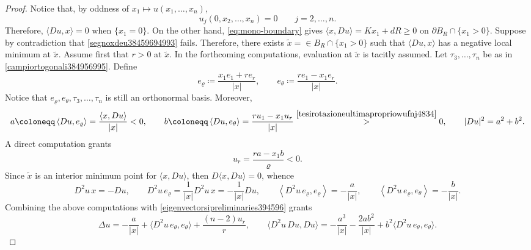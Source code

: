 \documentclass[11pt]{amsart}
\renewcommand{\geq}{\geqslant}
\renewcommand{\ge}{>}
\theoremstyle{definition}
\theoremstyle{remark}
\numberwithin{equation}{section}
\begin{document}
\begin{proof}
Notice that, by oddness of $x_1\mapsto u(x_1,\ldots,x_n)$,
\begin{equation*}
    u_j(0,x_2,\ldots, x_n)=0\qquad j=2,\ldots,n.
\end{equation*}
Therefore, $\langle Du,x\rangle=0$ when $\{x_1=0\}$. 
On the other hand, \eqref{eq:mono-boundary} gives $\langle x,Du\rangle=Kx_1+dR\geq0$ on $\partial B_R\cap \{x_1\ge 0\}$. Suppose by contradiction that \eqref{segnoxdeu38459694993} fails. Therefore, there exists $\tilde x=\in B_R\cap \{x_1\ge 0\}$ such that $\langle Du,x\rangle$ has a negative local minimum at $\tilde x$. Assume first that $r>0$ at $\tilde x$. In the forthcoming computations, evaluation at $\tilde x$ is tacitly assumed. Let $\tau_3,\ldots,\tau_n$ be as in \eqref{campiortogonali384956995}.
Define
\begin{equation*}
 e_\varrho\coloneqq\frac{x_1e_1+r e_r}{|x|},
 \qquad e_\theta\coloneqq\frac{r e_1-x_1e_r}{|x|}.
\end{equation*}
Notice that $e_\varrho,e_\theta, \tau_3,\ldots,\tau_n$ is still an orthonormal basis. Moreover,
\begin{equation}\label{segnidiaeb}
     a\coloneqq \left\langle Du,e_\varrho\right\rangle =\frac{\left\langle x,Du\right\rangle}{|x|}<0,
 \qquad
 b\coloneqq\left\langle Du, e_\theta\right\rangle=\frac{r u_1-x_1u_r}{|x|}\overset{\eqref{tesirotazioneultimapropriowufnj4834}}{\ge }0,\qquad |Du|^2=a^2+b^2.
\end{equation}
 A direct computation grants
\begin{equation}\label{eq:mono-radial-ur}
 u_r=\frac{ra-x_1b}{\varrho}<0.
\end{equation}
Since $\tilde x$ is an interior minimum point for $\langle x,Du\rangle$, then $D\langle x,Du\rangle=0$, whence 
\begin{equation*}
    D^2u\,x=-Du,\qquad D^2 u\,e_\varrho=\frac{1}{|x|}D^2 u\,x=-\frac{1}{|x|}Du,\qquad \left\langle D^2u\,e_\varrho,e_\varrho\right\rangle=-\frac {a}{|x|},\qquad  \left\langle D^2u\,e_\varrho,e_\theta\right\rangle=-\frac{b}{|x|}.
\end{equation*}
Combining the above computations with \eqref{eigenvectorsipreliminaries394596} grants
\begin{equation}\label{euqationejekcvoernftrfojnt5849}
    \Delta u=-\frac{a}{|x|}+\langle D^2 u\,e_\theta,e_\theta\rangle+\frac{(n-2)u_r}{r},\qquad \langle D^2 u\,Du,Du\rangle=-\frac{a^3}{|x|}-\frac{2a b^2}{|x|}+b^2\langle D^2 u\,e_\theta,e_\theta\rangle.
\end{equation}

\end{proof}
\end{document}
